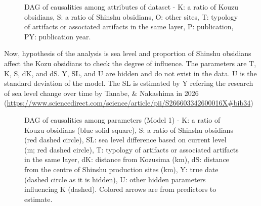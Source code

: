 \documentclass{article}
\begin{document}
\begin{figure}[H]
\centering 
{}
\caption{DAG of causalities among attributes of dataset - K: a ratio of Kouzu obsidians, S: a ratio of Shinshu obsidians, O: other sites, T: typology of artifacts or associated artifacts in the same layer, P: publication, PY: publication year.  }
\end{figure}

\newpage

Now, hypothesis of the analysis is sea level and proportion of Shinshu obsidians affect the Kozu obsidians to check the degree of influence. 
The parameters are T, K, S, dK, and dS. Y, SL, and U are hidden and do not exist in the data. U is the standard deviation of the model. 
The SL is estimated by Y refering the research of sea level change over time by Tanabe, & Nakashima in 2026 (\url{https://www.sciencedirect.com/science/article/pii/S266603342600016X#bib34})


\begin{figure}[H]
\centering 
{}
\caption{DAG of causalities among parameters (Model 1) - K: a ratio of Kouzu obsidians (blue solid square), S: a ratio of Shinshu obsidians (red dashed circle), SL: sea level difference based on current level (m; red dashed circle), T: typology of artifacts or associated artifacts in the same layer, dK: distance from Kozusima (km), dS: distance from the centre of Shinshu production sites (km), Y: true date (dashed circle as it is hidden), U: other hidden parameters influencing K (dashed). Colored arrows are from predictors to estimate. }
\end{figure}
\end{document}
